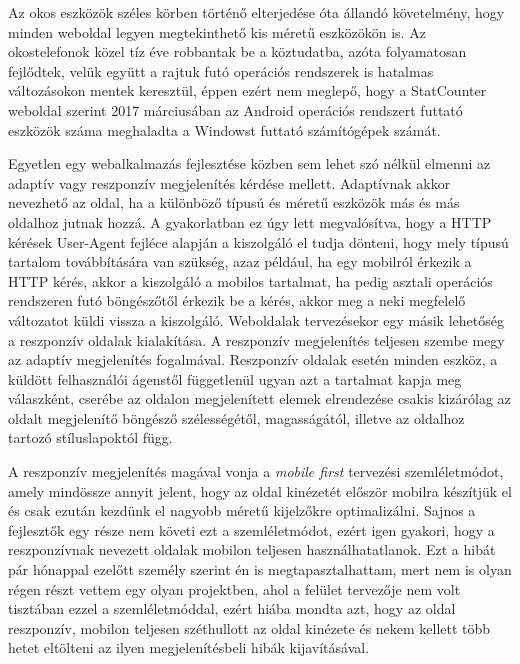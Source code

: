 \documentclass[hidelinks, 12pt, a4paper]{report}
\begin{document}
Az okos eszközök széles körben történő elterjedése óta állandó követelmény, hogy minden weboldal legyen megtekinthető kis méretű eszközökön is. Az okostelefonok közel tíz éve robbantak be a köztudatba, azóta folyamatosan fejlődtek, velük együtt a rajtuk futó operációs rendszerek is hatalmas változásokon mentek keresztül, éppen ezért nem meglepő, hogy a StatCounter \cite{statcounter} weboldal szerint 2017 márciusában az Android operációs rendszert futtató eszközök száma meghaladta a Windowst futtató számítógépek számát.

Egyetlen egy webalkalmazás fejlesztése közben sem lehet szó nélkül elmenni az adaptív vagy reszponzív megjelenítés kérdése mellett. Adaptívnak akkor nevezhető az oldal, ha a különböző típusú és méretű eszközök más és más oldalhoz jutnak hozzá. A gyakorlatban ez úgy lett megvalósítva, hogy a HTTP kérések User-Agent fejléce alapján a kiszolgáló el tudja dönteni, hogy mely típusú tartalom továbbítására van szükség, azaz például, ha egy mobilról érkezik a HTTP kérés, akkor a kiszolgáló a mobilos tartalmat, ha pedig asztali operációs rendszeren futó böngészőtől érkezik be a kérés, akkor meg a neki megfelelő változatot küldi vissza a kiszolgáló. Weboldalak tervezésekor egy másik lehetőség a reszponzív oldalak kialakítása. A reszponzív megjelenítés teljesen szembe megy az adaptív megjelenítés fogalmával. Reszponzív oldalak esetén minden eszköz, a küldött felhasználói ágenstől függetlenül ugyan azt a tartalmat kapja meg válaszként, cserébe az oldalon megjelenített elemek elrendezése csakis kizárólag az oldalt megjelenítő böngésző szélességétől, magasságától, illetve az oldalhoz tartozó stíluslapoktól függ.

A reszponzív megjelenítés magával vonja a \emph{mobile first} tervezési szemléletmódot, amely mindössze annyit jelent, hogy az oldal kinézetét először mobilra készítjük el és csak ezután kezdünk el nagyobb méretű kijelzőkre optimalizálni. Sajnos a fejlesztők egy része nem követi ezt a szemléletmódot, ezért igen gyakori, hogy a reszponzívnak nevezett oldalak mobilon teljesen használhatatlanok. Ezt a hibát pár hónappal ezelőtt személy szerint én is megtapasztalhattam, mert nem is olyan régen részt vettem egy olyan projektben, ahol a felület tervezője nem volt tisztában ezzel a szemléletmóddal, ezért hiába mondta azt, hogy az oldal reszponzív, mobilon teljesen széthullott az oldal kinézete és nekem kellett több hetet eltölteni az ilyen megjelenítésbeli hibák kijavításával.

\end{document}
